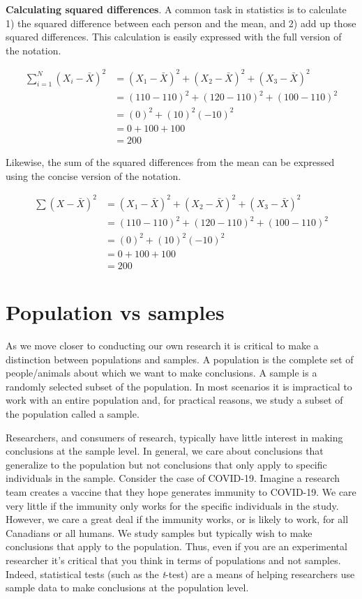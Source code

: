 \documentclass[
]{krantz}
\begin{document}
\textbf{Calculating squared differences}. A common task in statistics is to calculate 1) the squared difference between each person and the mean, and 2) add up those squared differences. This calculation is easily expressed with the full version of the notation.

\[
\begin{aligned} 
\sum_{i=1}^{N}{(X_i - \bar{X})^2} &= (X_1-\bar{X})^2 + (X_2-\bar{X})^2 + (X_3-\bar{X})^2\\ 
&= (110-110)^2 + (120-110)^2 + (100-110)^2\\
&= (0)^2 + (10)^2 (-10)^2 \\
&= 0 + 100 + 100 \\
&= 200
\end{aligned} 
\]

Likewise, the sum of the squared differences from the mean can be expressed using the concise version of the notation.

\[
\begin{aligned} 
\sum{(X - \bar{X})^2} &= (X_1-\bar{X})^2 + (X_2-\bar{X})^2 + (X_3-\bar{X})^2\\ 
&= (110-110)^2 + (120-110)^2 + (100-110)^2\\
&= (0)^2 + (10)^2 (-10)^2 \\
&= 0 + 100 + 100 \\
&= 200
\end{aligned} 
\]

\hypertarget{population-vs-samples}{%
\section{Population vs samples}\label{population-vs-samples}}

As we move closer to conducting our own research it is critical to make a distinction between populations and samples. A population is the complete set of people/animals about which we want to make conclusions. A sample is a randomly selected subset of the population. In most scenarios it is impractical to work with an entire population and, for practical reasons, we study a subset of the population called a sample.

Researchers, and consumers of research, typically have little interest in making conclusions at the sample level. In general, we care about conclusions that generalize to the population but not conclusions that only apply to specific individuals in the sample. Consider the case of COVID-19. Imagine a research team creates a vaccine that they hope generates immunity to COVID-19. We care very little if the immunity only works for the specific individuals in the study. However, we care a great deal if the immunity works, or is likely to work, for all Canadians or all humans. We study samples but typically wish to make conclusions that apply to the population. Thus, even if you are an experimental researcher it's critical that you think in terms of populations and not samples. Indeed, statistical tests (such as the \emph{t}-test) are a means of helping researchers use sample data to make conclusions at the population level.
\end{document}
